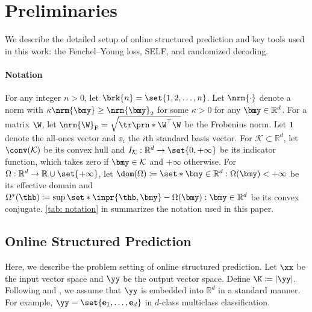\section{Preliminaries}
We describe the detailed setup of online structured prediction and key tools used in this work: the Fenchel--Young loss, SELF, and randomized decoding.
\paragraph{Notation}
For any integer $n > 0$, let $\brk{n} = \set{1,2,\hdots,n}$.
Let $\nrm{\cdot}$ denote a norm with $\kappa\nrm{\bmy}\geq\nrm{\bmy}_2$ for some $\kappa>0$ for any $\bmy\in\mathbb{R}^d$. 
For a matrix $\W$, let $\nrm{\W}_{\mathrm{F}}=\sqrt{\tr\prn*{\W^\top \W}}$ be the Frobenius norm. 
Let $\bm1$ denote the all-ones vector and $\bm{\ee}_i$ the $i$th standard basis vector.
For $\mathcal{\mathcal{K}}\subset \mathbb{R}^d$, let $\conv(\mathcal{K})$ be its convex hull and $I_{\mathcal{K}}:\mathbb{R}^d\to\set{0, +\infty}$ be its indicator function, which takes zero if $\bmy \in \mathcal{K}$ and $+\infty$ otherwise.
For $\Omega:\mathbb{R}^d\to\mathbb{R}\cup\set{+\infty}$, let $\dom(\Omega) \coloneqq \set*{\bmy \in \mathbb{R}^d:\Omega(\bmy) < +\infty}$ be its effective domain and $\Omega^*(\thb) \coloneqq \sup\set*{\inpr{\thb, \bmy} - \Omega(\bmy):\bmy \in \mathbb{R}^d}$ be its convex conjugate.
\cref{tab: notation} in  summarizes the notation used in this paper.


\subsection{Online Structured Prediction}
Here, we describe the problem setting of online structured prediction.
Let $\xx$ be the input vector space and $\yy$ be the output vector space.
Define $\K \coloneqq |\yy|$.
Following \citet{JMLR_2020_blondel} and \citet{pmlr-v247-sakaue24a}, we assume that $\yy$ is embedded into $\mathbb{R}^d$ in a standard manner.
For example, $\yy = \set{\bm{\mathrm{e}}_1,\hdots,\bm{\mathrm{e}}_d}$ in $d$-class multiclass classification.


